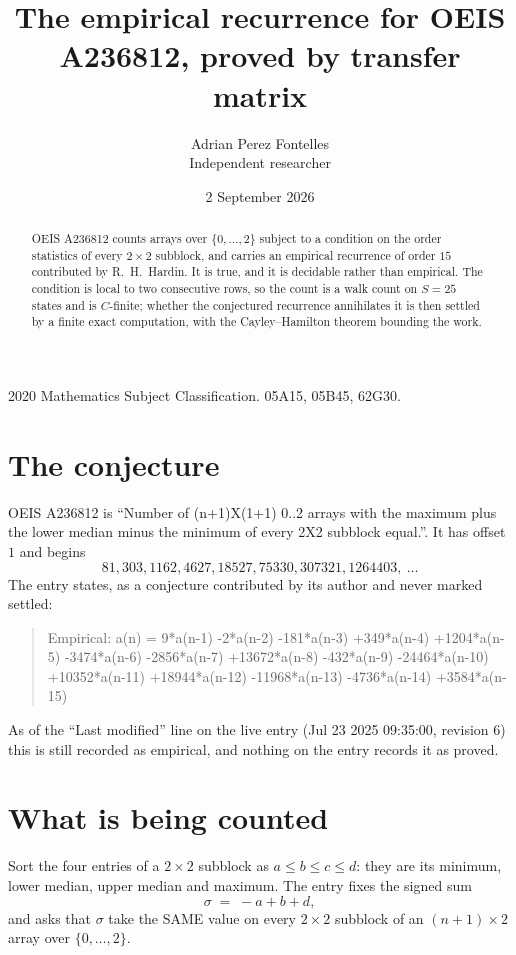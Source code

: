 \documentclass[11pt,a4paper]{article}
\title{The empirical recurrence for OEIS A236812, proved by transfer matrix}
\author{Adrian Perez Fontelles\\ \small Independent researcher}
\date{2 September 2026}
\theoremstyle{plain}
\theoremstyle{definition}
\begin{document}
\maketitle

\begin{abstract}
OEIS A236812 counts arrays over $\{0,\dots,2\}$ subject to a condition on the order
statistics of every $2\times2$ subblock, and carries an empirical recurrence of order
$15$ contributed by R.~H.~Hardin. It is true, and it is decidable rather than empirical.
The condition is local to two consecutive rows, so the count is a walk count on $S=25$
states and is $C$-finite; whether the conjectured recurrence annihilates it is then settled by
a finite exact computation, with the Cayley--Hamilton theorem bounding the work.
\end{abstract}

\noindent\small 2020 Mathematics Subject Classification. 05A15, 05B45, 62G30.\normalsize

\section{The conjecture}

OEIS A236812 is ``Number of (n+1)X(1+1) 0..2 arrays with the maximum plus the lower median minus the minimum of every 2X2 subblock equal.''. It has offset $1$ and begins
\[
81, 303, 1162, 4627, 18527, 75330, 307321, 1264403,\ \dots
\]
The entry states, as a conjecture contributed by its author and never marked settled:
\begin{quote}
Empirical: a(n) = 9*a(n-1) -2*a(n-2) -181*a(n-3) +349*a(n-4) +1204*a(n-5) -3474*a(n-6) -2856*a(n-7) +13672*a(n-8) -432*a(n-9) -24464*a(n-10) +10352*a(n-11) +18944*a(n-12) -11968*a(n-13) -4736*a(n-14) +3584*a(n-15)
\end{quote}
As of the ``Last modified'' line on the live entry (Jul 23 2025 09:35:00, revision 6) this is still
recorded as empirical, and nothing on the entry records it as proved.

\section{What is being counted}

Sort the four entries of a $2\times2$ subblock as $a\le b\le c\le d$: they
are its minimum, lower median, upper median and maximum. The entry fixes the signed sum
\[
\sigma\;=\;-a+b+d,
\]
and asks that $\sigma$ take the SAME value on every $2\times2$ subblock of an
$(n+1)\times2$ array over $\{0,\dots,2\}$.
\end{document}
